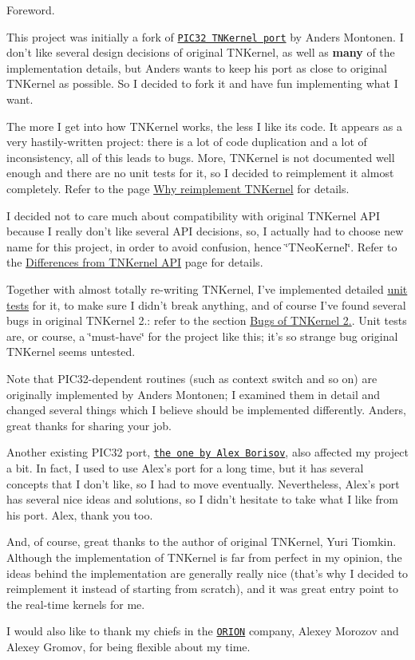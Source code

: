 Foreword.

This project was initially a fork of \href{https://github.com/andersm/TNKernel-PIC32}{\tt P\+I\+C32 T\+N\+Kernel port} by Anders Montonen. I don't like several design decisions of original T\+N\+Kernel, as well as {\bfseries many} of the implementation details, but Anders wants to keep his port as close to original T\+N\+Kernel as possible. So I decided to fork it and have fun implementing what I want.

The more I get into how T\+N\+Kernel works, the less I like its code. It appears as a very hastily-\/written project\+: there is a lot of code duplication and a lot of inconsistency, all of this leads to bugs. More, T\+N\+Kernel is not documented well enough and there are no unit tests for it, so I decided to reimplement it almost completely. Refer to the page \hyperlink{why_reimplement}{Why reimplement T\+N\+Kernel} for details.

I decided not to care much about compatibility with original T\+N\+Kernel A\+P\+I because I really don't like several A\+P\+I decisions, so, I actually had to choose new name for this project, in order to avoid confusion, hence \char`\"{}\+T\+Neo\+Kernel\char`\"{}. Refer to the \hyperlink{tnkernel_diff}{Differences from T\+N\+Kernel A\+P\+I} page for details.

Together with almost totally re-\/writing T\+N\+Kernel, I've implemented detailed \hyperlink{unit_tests}{unit tests} for it, to make sure I didn't break anything, and of course I've found several bugs in original T\+N\+Kernel 2.\+: refer to the section \hyperlink{why_reimplement_why_reimplement__bugs}{Bugs of T\+N\+Kernel 2.}. Unit tests are, or course, a \char`\"{}must-\/have\char`\"{} for the project like this; it's so strange bug original T\+N\+Kernel seems untested.

Note that P\+I\+C32-\/dependent routines (such as context switch and so on) are originally implemented by Anders Montonen; I examined them in detail and changed several things which I believe should be implemented differently. Anders, great thanks for sharing your job.

Another existing P\+I\+C32 port, \href{http://www.tnkernel.com/tn_port_pic24_dsPIC_PIC32.html}{\tt the one by Alex Borisov}, also affected my project a bit. In fact, I used to use Alex's port for a long time, but it has several concepts that I don't like, so I had to move eventually. Nevertheless, Alex's port has several nice ideas and solutions, so I didn't hesitate to take what I like from his port. Alex, thank you too.

And, of course, great thanks to the author of original T\+N\+Kernel, Yuri Tiomkin. Although the implementation of T\+N\+Kernel is far from perfect in my opinion, the ideas behind the implementation are generally really nice (that's why I decided to reimplement it instead of starting from scratch), and it was great entry point to the real-\/time kernels for me.

I would also like to thank my chiefs in the \href{http://orionspb.ru/}{\tt O\+R\+I\+O\+N} company, Alexey Morozov and Alexey Gromov, for being flexible about my time. 